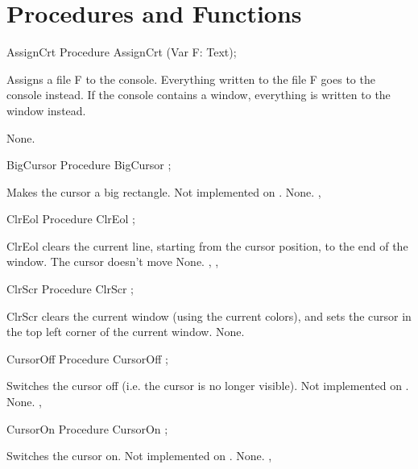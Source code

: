 \section{Procedures and Functions}
\begin{procedure}{AssignCrt}
\Declaration
Procedure AssignCrt (Var F: Text);

\Description

Assigns a file F to the console. Everything written to the file F goes to
the console instead. If the console contains a window, everything is written
to the window instead.

\Errors
None.
\SeeAlso
{}
\end{procedure}
 \html{}
\begin{procedure}{BigCursor}
\Declaration
Procedure BigCursor ;

\Description
Makes the cursor a big rectangle. 
Not implemented on \linux.
\Errors
None.
\SeeAlso
{}, 
\end{procedure}
\begin{procedure}{ClrEol}
\Declaration
Procedure ClrEol ;

\Description
 ClrEol clears the current line, starting from the cursor position, to the
end of the window. The cursor doesn't move
\Errors
None.
\SeeAlso
{}, , 
\end{procedure}
 \html{}
\begin{procedure}{ClrScr}
\Declaration
Procedure ClrScr ;

\Description
 ClrScr clears the current window (using the current colors), 
and sets the cursor in the top left
corner of the current window.
\Errors
None.
\SeeAlso
\end{procedure}
 \html{}
\begin{procedure}{CursorOff}
\Declaration
Procedure CursorOff ;

\Description
Switches the cursor off (i.e. the cursor is no
longer visible). 
Not implemented on \linux.
\Errors
None.
\SeeAlso
{}, 
\end{procedure}
\begin{procedure}{CursorOn}
\Declaration
Procedure CursorOn ;

\Description
Switches the cursor on. 
Not implemented on \linux.
\Errors
None.
\SeeAlso
{}, 
\end{procedure}
